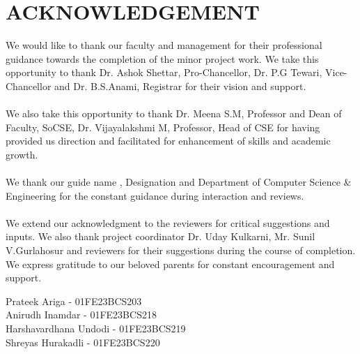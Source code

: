 \chapter*{ACKNOWLEDGEMENT}


\begin{justify}
    


We would like to thank our faculty and management for their professional guidance towards
the completion of the minor project work. We take this opportunity to thank Dr. Ashok
Shettar, Pro-Chancellor, Dr. P.G Tewari, Vice-Chancellor and Dr. B.S.Anami, Registrar for
their vision and support. \\ \\
We also take this opportunity to thank Dr. Meena S.M, Professor and Dean of Faculty, SoCSE, Dr. Vijayalakshmi M, Professor, Head of CSE for having provided us direction and
facilitated for enhancement of skills and academic growth. \\ \\
We thank our guide name , Designation and Department of Computer Science \& Engineering for the constant
guidance during interaction and reviews. \\ \\
We extend our acknowledgment to the reviewers for critical suggestions and inputs. We also
thank project coordinator Dr. Uday Kulkarni, Mr. Sunil V.Gurlahosur and reviewers for their suggestions during the
course of completion. We express gratitude to our beloved parents for constant encouragement
and support. 

\end{justify}

\begin{flushright}
\vspace{3cm}

Prateek Ariga - 01FE23BCS203\\
\indent\indent\indent\indent\indent\indent\indent\indent\indent\indent\indent\indent\indent\indent\indent\indent\indent\indent\indent Anirudh Inamdar - 01FE23BCS218\\
\indent\indent\indent\indent\indent\indent\indent\indent\indent\indent\indent\indent\indent\indent\indent\indent\indent\indent\indent Harshavardhana Undodi - 01FE23BCS219\\
\indent\indent\indent\indent\indent\indent\indent\indent\indent\indent\indent\indent\indent\indent\indent\indent\indent\indent\indent Shreyas Hurakadli - 01FE23BCS220\\
 
 
\end{flushright}
